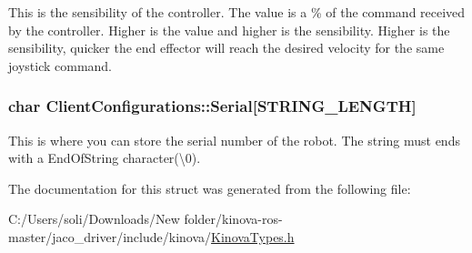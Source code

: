 This is the sensibility of the controller. The value is a \% of the command received by the controller. Higher is the value and higher is the sensibility. Higher is the sensibility, quicker the end effector will reach the desired velocity for the same joystick command. 

\subsubsection[{\texorpdfstring{Serial}{Serial}}]{\setlength{\rightskip}{0pt plus 5cm}char Client\+Configurations\+::\+Serial\mbox{[}{\bf S\+T\+R\+I\+N\+G\+\_\+\+L\+E\+N\+G\+TH}\mbox{]}}\hypertarget{struct_client_configurations_adb0902769a42d7eaf9cce979d0779723}{}\label{struct_client_configurations_adb0902769a42d7eaf9cce979d0779723}


This is where you can store the serial number of the robot. The string must ends with a End\+Of\+String character(\textbackslash{}0). 



The documentation for this struct was generated from the following file\+:\begin{DoxyCompactItemize}
\item 
C\+:/\+Users/soli/\+Downloads/\+New folder/kinova-\/ros-\/master/jaco\+\_\+driver/include/kinova/\hyperlink{_kinova_types_8h}{Kinova\+Types.\+h}\end{DoxyCompactItemize}
